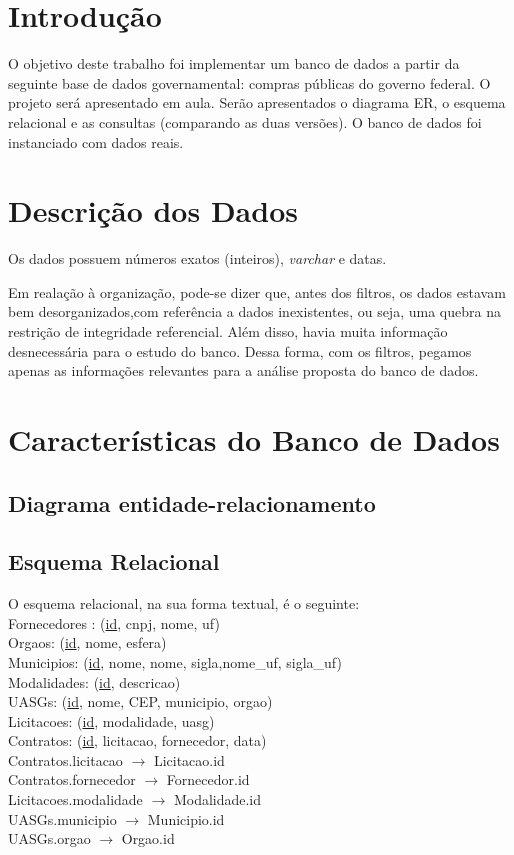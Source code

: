 \documentclass{article}
\begin{document}
\newpage
{}
\section{Introdução}
O objetivo deste trabalho foi implementar um banco de dados a partir da seguinte base de dados
governamental: compras públicas do governo federal. O projeto será apresentado em aula. Serão apresentados o diagrama
ER, o esquema relacional e as consultas (comparando as duas versões). O banco de dados foi instanciado
com dados reais.
\section{Descrição dos Dados}
Os dados possuem números exatos (inteiros), \textit{varchar} e datas.
\par Em realação à organização, pode-se dizer que, antes dos filtros, os dados estavam bem
desorganizados,com referência a dados inexistentes, ou seja, uma quebra na restrição de integridade referencial.
Além disso, havia muita informação desnecessária para o estudo do banco. Dessa forma, com os filtros,
pegamos apenas as informações relevantes para a análise proposta do banco de dados. 
\section{Características do Banco de Dados}
\subsection { Diagrama entidade-relacionamento}
\subsection {Esquema Relacional}
\noindent
O esquema relacional, na sua forma textual, é o seguinte: \\[10pt]
Fornecedores : (\underline{id}, cnpj, nome, uf) \\
Orgaos: (\underline{id}, nome, esfera) \\
Municipios: (\underline{id}, nome, nome, sigla,nome\_uf, sigla\_uf) \\
Modalidades: (\underline{id}, descricao) \\
UASGs: (\underline{id}, nome, CEP, municipio, orgao) \\
Licitacoes: (\underline{id}, modalidade, uasg) \\
Contratos: (\underline{id}, licitacao, fornecedor, data) \\[5pt]
Contratos.licitacao $\rightarrow$ Licitacao.id \\
Contratos.fornecedor $\rightarrow$ Fornecedor.id \\
Licitacoes.modalidade $\rightarrow$ Modalidade.id \\
UASGs.municipio $\rightarrow$ Municipio.id \\
UASGs.orgao $\rightarrow$ Orgao.id
\end{document}
